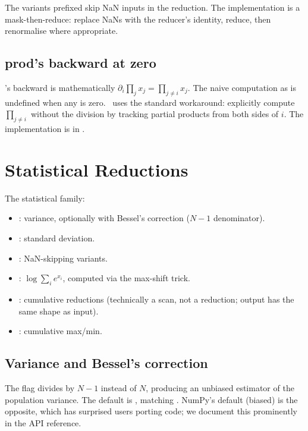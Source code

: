 The variants prefixed  skip NaN inputs in the reduction.
The implementation is a mask-then-reduce: replace NaNs with the
reducer's identity, reduce, then renormalise where appropriate.

\subsection{prod's backward at zero}
\label{ssec:reductions:prod_zero}

's backward is mathematically \(\partial_i \prod_j x_j =
\prod_{j \neq i} x_j\). The naive computation as
 is undefined when any  is zero.
\Lucid\ uses the standard workaround: explicitly compute
\(\prod_{j \neq i}\) without the division by tracking partial
products from both sides of \(i\). The implementation is in
.

\section{Statistical Reductions}
\label{sec:reductions:statistical}

The statistical family:

\begin{itemize}
  \item {}: variance, optionally with
    Bessel's correction (\(N-1\) denominator).
  \item {}: standard deviation.
  \item {}: NaN-skipping variants.
  \item {}: \(\log\sum_i e^{x_i}\), computed
    via the max-shift trick.
  \item {}: cumulative reductions
    (technically a scan, not a reduction; output has the same
    shape as input).
  \item {}: cumulative max/min.
\end{itemize}

\subsection{Variance and Bessel's correction}
\label{ssec:reductions:bessel}

The  flag divides by \(N - 1\) instead of \(N\),
producing an unbiased estimator of the population variance. The
default is , matching . NumPy's default
 (biased) is the opposite, which has surprised users
porting code; we document this prominently in the API reference.


